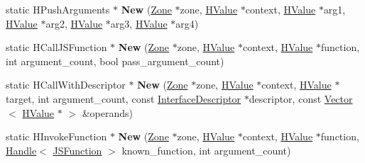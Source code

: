 \begin{DoxyCompactItemize}
\item 
\hypertarget{classv8_1_1internal_1_1_v8___f_i_n_a_l_a77081934ea7a39e74341e4dd2c4aec5d}{}static H\+Push\+Arguments $\ast$ {\bfseries New} (\hyperlink{classv8_1_1internal_1_1_zone}{Zone} $\ast$zone, \hyperlink{classv8_1_1internal_1_1_h_value}{H\+Value} $\ast$context, \hyperlink{classv8_1_1internal_1_1_h_value}{H\+Value} $\ast$arg1, \hyperlink{classv8_1_1internal_1_1_h_value}{H\+Value} $\ast$arg2, \hyperlink{classv8_1_1internal_1_1_h_value}{H\+Value} $\ast$arg3, \hyperlink{classv8_1_1internal_1_1_h_value}{H\+Value} $\ast$arg4)\label{classv8_1_1internal_1_1_v8___f_i_n_a_l_a77081934ea7a39e74341e4dd2c4aec5d}

\item 
\hypertarget{classv8_1_1internal_1_1_v8___f_i_n_a_l_a4cc9c53ff66aee6e2ca477100f80d81c}{}static H\+Call\+J\+S\+Function $\ast$ {\bfseries New} (\hyperlink{classv8_1_1internal_1_1_zone}{Zone} $\ast$zone, \hyperlink{classv8_1_1internal_1_1_h_value}{H\+Value} $\ast$context, \hyperlink{classv8_1_1internal_1_1_h_value}{H\+Value} $\ast$function, int argument\+\_\+count, bool pass\+\_\+argument\+\_\+count)\label{classv8_1_1internal_1_1_v8___f_i_n_a_l_a4cc9c53ff66aee6e2ca477100f80d81c}

\item 
\hypertarget{classv8_1_1internal_1_1_v8___f_i_n_a_l_a1f7865c51c57893561deddd98370cdd8}{}static H\+Call\+With\+Descriptor $\ast$ {\bfseries New} (\hyperlink{classv8_1_1internal_1_1_zone}{Zone} $\ast$zone, \hyperlink{classv8_1_1internal_1_1_h_value}{H\+Value} $\ast$context, \hyperlink{classv8_1_1internal_1_1_h_value}{H\+Value} $\ast$target, int argument\+\_\+count, const \hyperlink{classv8_1_1internal_1_1_interface_descriptor}{Interface\+Descriptor} $\ast$descriptor, const \hyperlink{classv8_1_1internal_1_1_vector}{Vector}$<$ \hyperlink{classv8_1_1internal_1_1_h_value}{H\+Value} $\ast$ $>$ \&operands)\label{classv8_1_1internal_1_1_v8___f_i_n_a_l_a1f7865c51c57893561deddd98370cdd8}

\item 
\hypertarget{classv8_1_1internal_1_1_v8___f_i_n_a_l_a57797121efa2987f09956d92364e1112}{}static H\+Invoke\+Function $\ast$ {\bfseries New} (\hyperlink{classv8_1_1internal_1_1_zone}{Zone} $\ast$zone, \hyperlink{classv8_1_1internal_1_1_h_value}{H\+Value} $\ast$context, \hyperlink{classv8_1_1internal_1_1_h_value}{H\+Value} $\ast$function, \hyperlink{classv8_1_1internal_1_1_handle}{Handle}$<$ \hyperlink{classv8_1_1internal_1_1_j_s_function}{J\+S\+Function} $>$ known\+\_\+function, int argument\+\_\+count)\label{classv8_1_1internal_1_1_v8___f_i_n_a_l_a57797121efa2987f09956d92364e1112}


\end{DoxyCompactItemize}

